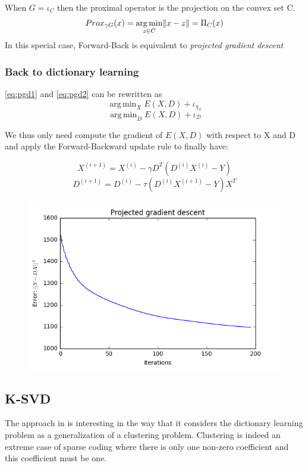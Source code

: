 \documentclass[a4paper,11pt]{article}
\DeclarePairedDelimiter\norm{\lVert}{\rVert} %
\DeclareMathOperator*{\argmin}{arg\,min} %
\begin{document}
When $G = \iota_C$ then the proximal operator is the projection on the convex set C.
$$Prox_{\gamma G}(x) = \argmin_{z \in C} \norm{x - z} = \Pi_C(x)$$
In this special case, Forward-Back is equivalent to \emph{projected gradient descent}


\subsubsection*{Back to dictionary learning}
\ref{eq:pgd1} and \ref{eq:pgd2} can be rewritten as
$$\argmin_X E(X,D) + \iota_{\chi_k}$$
$$\argmin_D E(X,D) + \iota_{\mathcal{D}}$$

We thus only need compute the gradient of $E(X,D)$ with respect to X and D and apply the Forward-Backward update rule to finally have:

$$ X^{(i+1)} = X^{(i)} - \gamma D^T (D^{(i)}X^{(i)} - Y) $$
$$ D^{(i+1)} = D^{(i)} - \tau (D^{(i)}X^{(i+1)} - Y) X^T $$

\begin{figure}[!htbp]
\centering
  \includegraphics[width=\linewidth]{projected_gradient_descent.png}
\end{figure}

\subsection{K-SVD}
The approach in \cite{aharon06} is interesting in the way that it considers the dictionary learning problem as a generalization of a clustering problem. Clustering is indeed an extreme case of sparse coding where there is only one non-zero coefficient and this coefficient must be one.
\end{document}
